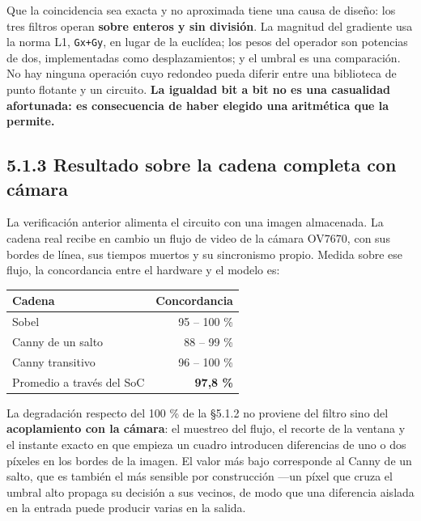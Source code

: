 Que la coincidencia sea exacta y no aproximada tiene una causa de
diseño: los tres filtros operan \textbf{sobre enteros y sin división}.
La magnitud del gradiente usa la norma L1,
\texttt{\textbar{}Gx\textbar{}+\textbar{}Gy\textbar{}}, en lugar de la
euclídea; los pesos del operador son potencias de dos, implementadas
como desplazamientos; y el umbral es una comparación. No hay ninguna
operación cuyo redondeo pueda diferir entre una biblioteca de punto
flotante y un circuito. \textbf{La igualdad bit a bit no es una
casualidad afortunada: es consecuencia de haber elegido una aritmética
que la permite.}

\subsection{5.1.3 Resultado sobre la cadena completa con
cámara}\label{resultado-sobre-la-cadena-completa-con-cuxe1mara}

La verificación anterior alimenta el circuito con una imagen almacenada.
La cadena real recibe en cambio un flujo de video de la cámara OV7670,
con sus bordes de línea, sus tiempos muertos y su sincronismo propio.
Medida sobre ese flujo, la concordancia entre el hardware y el modelo
es:

\begin{longtable}[]{@{}lr@{}}
\toprule\noalign{}
Cadena & Concordancia \\
\midrule\noalign{}
\endhead
\bottomrule\noalign{}
\endlastfoot
Sobel & 95 -- 100 \% \\
Canny de un salto & 88 -- 99 \% \\
Canny transitivo & 96 -- 100 \% \\
Promedio a través del SoC & \textbf{97,8 \%} \\
\end{longtable}

La degradación respecto del 100 \% de la §5.1.2 no proviene del filtro
sino del \textbf{acoplamiento con la cámara}: el muestreo del flujo, el
recorte de la ventana y el instante exacto en que empieza un cuadro
introducen diferencias de uno o dos píxeles en los bordes de la imagen.
El valor más bajo corresponde al Canny de un salto, que es también el
más sensible por construcción ---un píxel que cruza el umbral alto
propaga su decisión a sus vecinos, de modo que una diferencia aislada en
la entrada puede producir varias en la salida.

